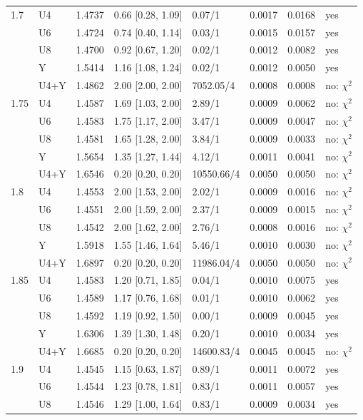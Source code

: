 \documentclass[10pt,a4paper]{article}
\begin{document}
{\begin{longtable}{@{}llllllll@{}}
1.7 & U4 & 1.4737 & 0.66 [0.28, 1.09] & 0.07/1 & 0.0017 & 0.0168 & yes \\
 & U6 & 1.4724 & 0.74 [0.40, 1.14] & 0.03/1 & 0.0015 & 0.0157 & yes \\
 & U8 & 1.4700 & 0.92 [0.67, 1.20] & 0.02/1 & 0.0012 & 0.0082 & yes \\
 & Y & 1.5414 & 1.16 [1.08, 1.24] & 0.02/1 & 0.0012 & 0.0050 & yes \\
 & U4+Y & 1.4862 & 2.00 [2.00, 2.00] & 7052.05/4 & 0.0008 & 0.0008 & no: $\chi^2$ \\
1.75 & U4 & 1.4587 & 1.69 [1.03, 2.00] & 2.89/1 & 0.0009 & 0.0062 & no: $\chi^2$ \\
 & U6 & 1.4583 & 1.75 [1.17, 2.00] & 3.47/1 & 0.0009 & 0.0047 & no: $\chi^2$ \\
 & U8 & 1.4581 & 1.65 [1.28, 2.00] & 3.84/1 & 0.0009 & 0.0033 & no: $\chi^2$ \\
 & Y & 1.5654 & 1.35 [1.27, 1.44] & 4.12/1 & 0.0011 & 0.0041 & no: $\chi^2$ \\
 & U4+Y & 1.6546 & 0.20 [0.20, 0.20] & 10550.66/4 & 0.0050 & 0.0050 & no: $\chi^2$ \\
1.8 & U4 & 1.4553 & 2.00 [1.53, 2.00] & 2.02/1 & 0.0009 & 0.0016 & no: $\chi^2$ \\
 & U6 & 1.4551 & 2.00 [1.59, 2.00] & 2.37/1 & 0.0009 & 0.0015 & no: $\chi^2$ \\
 & U8 & 1.4542 & 2.00 [1.62, 2.00] & 2.76/1 & 0.0008 & 0.0016 & no: $\chi^2$ \\
 & Y & 1.5918 & 1.55 [1.46, 1.64] & 5.46/1 & 0.0010 & 0.0030 & no: $\chi^2$ \\
 & U4+Y & 1.6897 & 0.20 [0.20, 0.20] & 11986.04/4 & 0.0050 & 0.0050 & no: $\chi^2$ \\
1.85 & U4 & 1.4583 & 1.20 [0.71, 1.85] & 0.04/1 & 0.0010 & 0.0075 & yes \\
 & U6 & 1.4589 & 1.17 [0.76, 1.68] & 0.01/1 & 0.0010 & 0.0062 & yes \\
 & U8 & 1.4592 & 1.19 [0.92, 1.50] & 0.00/1 & 0.0009 & 0.0045 & yes \\
 & Y & 1.6306 & 1.39 [1.30, 1.48] & 0.20/1 & 0.0010 & 0.0034 & yes \\
 & U4+Y & 1.6685 & 0.20 [0.20, 0.20] & 14600.83/4 & 0.0045 & 0.0045 & no: $\chi^2$ \\
1.9 & U4 & 1.4545 & 1.15 [0.63, 1.87] & 0.89/1 & 0.0011 & 0.0072 & yes \\
 & U6 & 1.4544 & 1.23 [0.78, 1.81] & 0.83/1 & 0.0011 & 0.0057 & yes \\
 & U8 & 1.4546 & 1.29 [1.00, 1.64] & 0.83/1 & 0.0009 & 0.0034 & yes \\

\end{longtable}}
\end{document}
